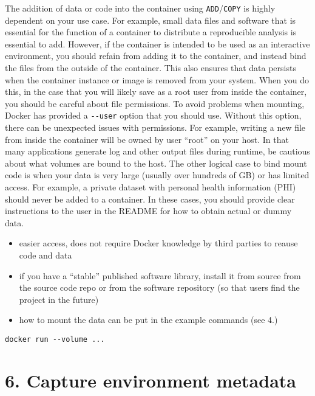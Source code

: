 \documentclass[10pt,letterpaper]{article}
\providecommand{\tightlist}{%
  \setlength{\itemsep}{0pt}\setlength{\parskip}{0pt}}
\begin{document}
The addition of data or code into the container using
\texttt{ADD}/\texttt{COPY} is highly dependent on your use case. For
example, small data files and software that is essential for the
function of a container to distribute a reproducible analysis is
essential to add. However, if the container is intended to be used as an
interactive environment, you should refain from adding it to the
container, and instead bind the files from the outside of the container.
This also ensures that data persists when the container instance or
image is removed from your system. When you do this, in the case that
you will likely save as a root user from inside the container, you
should be careful about file permissions. To avoid problems when
mounting, Docker has provided a \texttt{-\/-user} option that you should
use. Without this option, there can be unexpected issues with
permissions. For example, writing a new file from inside the container
will be owned by user ``root'' on your host. In that many applications
generate log and other output files during runtime, be cautious about
what volumes are bound to the host. The other logical case to bind mount
code is when your data is very large (usually over hundreds of GB) or
has limited access. For example, a private dataset with personal health
information (PHI) should never be added to a container. In these cases,
you should provide clear instructions to the user in the README for how
to obtain actual or dummy data.

\begin{itemize}
\tightlist
\item
  easier access, does not require Docker knowledge by third parties to
  reause code and data
\item
  if you have a ``stable'' published software library, install it from
  source from the source code repo or from the software repository (so
  that users find the project in the future)
\item
  how to mount the data can be put in the example commands (see 4.)
\end{itemize}

\begin{verbatim}
docker run --volume ...
\end{verbatim}

\hypertarget{capture-environment-metadata}{%
\section*{6. Capture environment
metadata}\label{capture-environment-metadata}}
\end{document}
